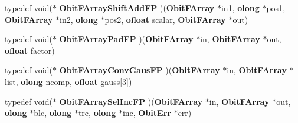 \begin{CompactItemize}
\item 
typedef void($\ast$ {\bf Obit\-FArray\-Shift\-Add\-FP} )({\bf Obit\-FArray} $\ast$in1, {\bf olong} $\ast$pos1, {\bf Obit\-FArray} $\ast$in2, {\bf olong} $\ast$pos2, {\bf ofloat} scalar, {\bf Obit\-FArray} $\ast$out)
\item 
typedef void($\ast$ {\bf Obit\-FArray\-Pad\-FP} )({\bf Obit\-FArray} $\ast$in, {\bf Obit\-FArray} $\ast$out, {\bf ofloat} factor)
\item 
typedef void($\ast$ {\bf Obit\-FArray\-Conv\-Gaus\-FP} )({\bf Obit\-FArray} $\ast$in, {\bf Obit\-FArray} $\ast$list, {\bf olong} ncomp, {\bf ofloat} gauss[3])
\item 
typedef void($\ast$ {\bf Obit\-FArray\-Sel\-Inc\-FP} )({\bf Obit\-FArray} $\ast$in, {\bf Obit\-FArray} $\ast$out, {\bf olong} $\ast$blc, {\bf olong} $\ast$trc, {\bf olong} $\ast$inc, {\bf Obit\-Err} $\ast$err)
\end{CompactItemize}
